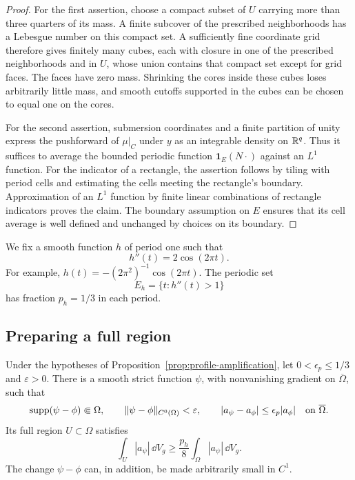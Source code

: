 \begin{proof}
For the first assertion, choose a compact subset of $U$ carrying more than
three quarters of its mass.  A finite subcover of the prescribed
neighborhoods has a Lebesgue number on this compact set.  A sufficiently fine
coordinate grid therefore gives finitely many cubes, each with closure in
one of the prescribed neighborhoods and in $U$, whose union contains that
compact set except for grid faces.  The faces have zero mass.  Shrinking the
cores inside these cubes loses arbitrarily little mass, and smooth cutoffs
supported in the cubes can be chosen to equal one on the cores.

For the second assertion, submersion coordinates and a finite partition of
unity express the pushforward of $\mu|_C$ under $y$ as an integrable density
on $\mathbb R^q$.  Thus it suffices to average the bounded periodic function
$\mathbf 1_E(N\cdot)$ against an $L^1$ function.  For the indicator of a
rectangle, the assertion follows by tiling with period cells and estimating
the cells meeting the rectangle's boundary.  Approximation of an $L^1$
function by finite linear combinations of rectangle indicators proves the
claim.  The boundary assumption on $E$ ensures that its cell average is
well defined and unchanged by choices on its boundary.
\end{proof}

We fix a smooth function $h$ of period one such that
\[
 h''(t)=2\cos(2\pi t).
\]
For example, $h(t)=-(2\pi^2)^{-1}\cos(2\pi t)$.  The periodic set
\[
 E_h=\{t:h''(t)>1\}
\]
has fraction $p_h=1/3$ in each period.

\subsection{Preparing a full region}

\begin{lemma}[Preparation]
\label{lem:profile-preparation}
Under the hypotheses of Proposition~\ref{prop:profile-amplification}, let
$0<\epsilon_p\le1/3$ and $\varepsilon>0$.  There is a smooth strict
function $\psi$, with nonvanishing gradient on $\overline\Omega$, such that
\[
 \operatorname{supp}(\psi-\phi)\Subset\Omega,\qquad
 \|\psi-\phi\|_{C^0(\Omega)}<\varepsilon,
 \qquad |a_\psi-a_\phi|\le\epsilon_p|a_\phi|
 \quad\hbox{on }\overline\Omega.
\]
Its full region $U\subset\Omega$ satisfies
\begin{equation}
 \int_U|a_\psi|\,\dd V_g
 \ge\frac{p_h}{8}\int_\Omega|a_\psi|\,\dd V_g.
 \label{eq:prepared-mass}
\end{equation}
The change $\psi-\phi$ can, in addition, be made arbitrarily small in
$C^1$.
\end{lemma}

